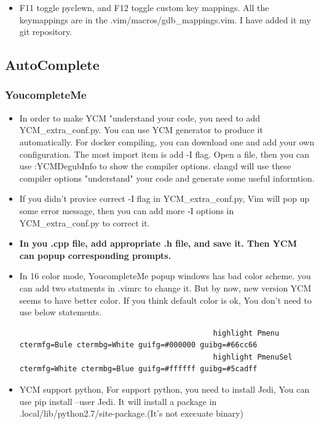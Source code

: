 \documentclass[paper=8.5in:11in, twoside, 12pt, pagesize=pdftex]{book}
\begin{document}
\begin{itemize}
										\item F11 toggle pyclewn, and F12 toggle custom key mappings. All the keymappings are in the .vim/macros/gdb\_mappings.vim. I have added it my git repository. 
									\end{itemize}
									
									\subsection{AutoComplete}
									\subsubsection{YoucompleteMe}
									
									\begin{itemize}
										\item In order to make YCM "understand your code, you need to add YCM\_extra\_conf.py. You can use YCM generator to produce it automatically. For docker compiling, you can download one and add your own configuration. The most import item is add -I flag. Open a file, then you can use :YCMDegubInfo to show the compiler options. clangd will use these compiler options "understand" your code and generate some useful informtion.
										
										\item If you didn't provice correct -I flag in YCM\_extra\_conf.py, Vim will pop up some error message, then you can add more -I options in YCM\_extra\_conf.py to correct it.
										
										\item \textbf{In you .cpp file, add appropriate .h file, and save it. Then YCM can  popup corresponding prompts.} 
										
										\item In 16 color mode, YoucompleteMe popup windows has bad color scheme. you can add two statments in .vimrc to change it. But by now, new version YCM seems to have better color. If you think default color is ok, You don't need to use below statements. 
										\begin{verbatim}
											highlight Pmenu ctermfg=Bule ctermbg=White guifg=#000000 guibg=#66cc66
											highlight PmenuSel ctermfg=White ctermbg=Blue guifg=#ffffff guibg=#5cadff
										\end{verbatim}
										
										\item YCM support python, For support python, you need to install Jedi, You can use pip install --user Jedi.	It will install a package in .local/lib/python2.7/site-package.(It's not execuate binary)	
										

\end{itemize}
\end{document}
